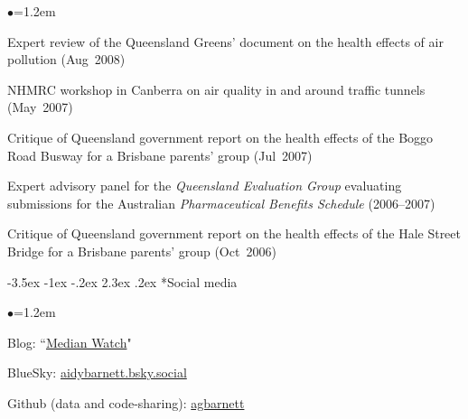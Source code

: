 \documentclass[a4paper,11pt]{article}
\makeatletter
\renewcommand\section{\@startsection {section}{1}{\z@}%
                                   {-3.5ex \@plus -1ex \@minus -.2ex}%
                                   {2.3ex \@plus.2ex}%
                                   {\normalfont\large\bfseries\color{blue}}}
\renewcommand{\labelitemi}{$\bullet$}
\makeatother
\begin{document}
\begin{raggedright}
\begin{list}{\labelitemi}{\leftmargin=1.2em}
\item Expert review of the Queensland Greens' document on the health effects of air pollution (Aug~2008)
\item NHMRC workshop in Canberra on air quality in and around traffic tunnels (May~2007)
\item Critique of Queensland government report on the health effects of the Boggo Road Busway for a Brisbane parents' group (Jul~2007)
\item Expert advisory panel for the \textit{Queensland Evaluation Group} evaluating submissions for the Australian \textit{Pharmaceutical Benefits Schedule} (2006--2007)
\item Critique of Queensland government report on the health effects of the Hale Street Bridge for a Brisbane parents' group (Oct~2006)
\end{list}


\section*{Social media}

\begin{list}{\labelitemi}{\leftmargin=1.2em}\addtolength{\itemsep}{-0.4\baselineskip}
\item Blog: ``\href{https://medianwatch.netlify.app/}{Median Watch}"
\item BlueSky: \href{https://bsky.app/profile/aidybarnett.bsky.social}{aidybarnett.bsky.social}
\item Github (data and code-sharing): \href{https://github.com/agbarnett}{agbarnett}
\end{list}



\end{raggedright}
\end{document}
